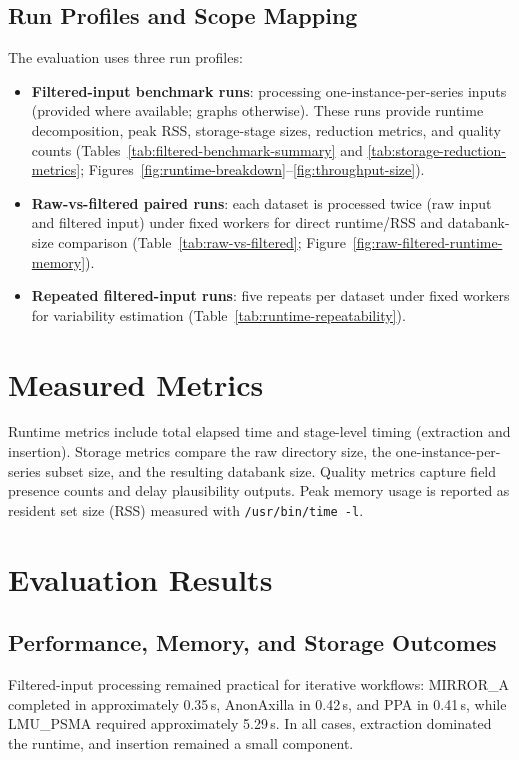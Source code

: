 \subsection*{Run Profiles and Scope Mapping}
The evaluation uses three run profiles:
\begin{itemize}
\item \textbf{Filtered-input benchmark runs}: processing one-instance-per-series inputs (provided where available; graphs otherwise). These runs provide runtime decomposition, peak RSS, storage-stage sizes, reduction metrics, and quality counts (Tables~\ref{tab:filtered-benchmark-summary} and \ref{tab:storage-reduction-metrics}; Figures~\ref{fig:runtime-breakdown}--\ref{fig:throughput-size}).
\item \textbf{Raw-vs-filtered paired runs}: each dataset is processed twice (raw input and filtered input) under fixed workers for direct runtime/RSS and databank-size comparison (Table~\ref{tab:raw-vs-filtered}; Figure~\ref{fig:raw-filtered-runtime-memory}).
\item \textbf{Repeated filtered-input runs}: five repeats per dataset under fixed workers for variability estimation (Table~\ref{tab:runtime-repeatability}).
\end{itemize}

\section{Measured Metrics}
Runtime metrics include total elapsed time and stage-level timing (extraction and insertion). Storage metrics compare the raw directory size, the one-instance-per-series subset size, and the resulting databank size. Quality metrics capture field presence counts and delay plausibility outputs. Peak memory usage is reported as resident set size (RSS) measured with \texttt{/usr/bin/time -l}.

\section{Evaluation Results}
\subsection{Performance, Memory, and Storage Outcomes}
Filtered-input processing remained practical for iterative workflows: MIRROR\_A completed in approximately 0.35\,s, AnonAxilla in 0.42\,s, and PPA in 0.41\,s, while LMU\_PSMA required approximately 5.29\,s. In all cases, extraction dominated the runtime, and insertion remained a small component.

